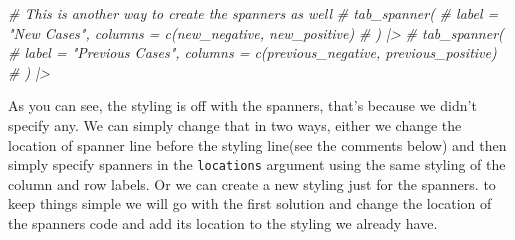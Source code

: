 \documentclass[
]{article}
\newenvironment{Shaded}{\begin{snugshade}}{\end{snugshade}}
\newcommand{\CommentTok}[1]{\textcolor[rgb]{0.56,0.35,0.01}{\textit{#1}}}
\begin{document}
\begin{Shaded}
\begin{Highlighting}[]
  \CommentTok{\# This is another way to create the spanners as well}
  \CommentTok{\# tab\_spanner(}
  \CommentTok{\#   label = "New Cases", columns = c(new\_negative, new\_positive)}
  \CommentTok{\# ) |\textgreater{} }
  \CommentTok{\# tab\_spanner(}
  \CommentTok{\#   label = "Previous Cases", columns = c(previous\_negative, previous\_positive)}
  \CommentTok{\# ) |\textgreater{} }
\end{Highlighting}
\end{Shaded}

As you can see, the styling is off with the spanners, that's because we
didn't specify any. We can simply change that in two ways, either we
change the location of spanner line before the styling line(see the
comments below) and then simply specify spanners in the
\texttt{locations} argument using the same styling of the column and row
labels. Or we can create a new styling just for the spanners. to keep
things simple we will go with the first solution and change the location
of the spanners code and add its location to the styling we already
have.
\end{document}
